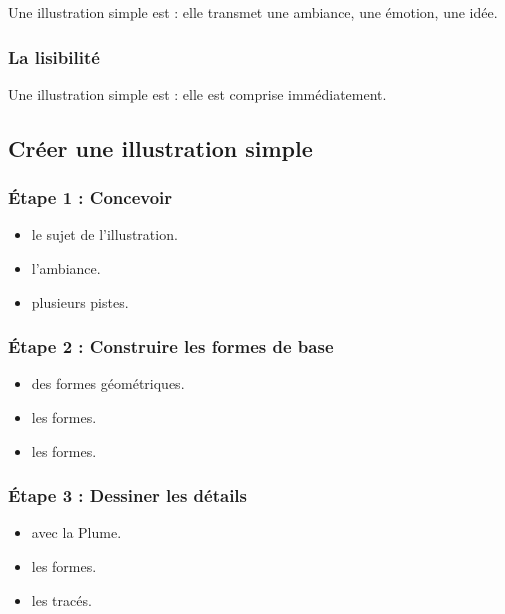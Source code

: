 Une illustration simple est  : elle transmet une ambiance, une émotion, une idée.

\subsubsection{La lisibilité}

Une illustration simple est  : elle est comprise immédiatement.

\subsection{Créer une illustration simple}

\subsubsection{Étape 1 : Concevoir}

\begin{itemize}
    \item {} le sujet de l'illustration.
    \item {} l'ambiance.
    \item {} plusieurs pistes.
\end{itemize}

\subsubsection{Étape 2 : Construire les formes de base}

\begin{itemize}
    \item {} des formes géométriques.
    \item {} les formes.
    \item {} les formes.
\end{itemize}

\subsubsection{Étape 3 : Dessiner les détails}

\begin{itemize}
    \item {} avec la Plume.
    \item {} les formes.
    \item {} les tracés.
\end{itemize}

